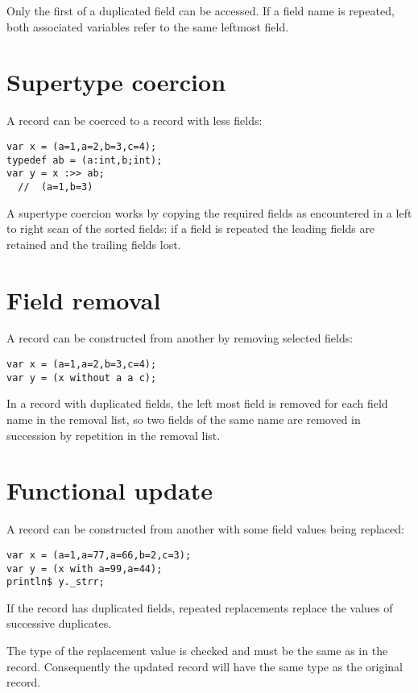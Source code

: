 \documentclass{article}
\begin{document}
Only the first of a duplicated field can be accessed.
If a field name is repeated, both associated variables
refer to the same leftmost field.

\section{Supertype coercion}
A record can be coerced to a record with less fields:

\begin{verbatim}
var x = (a=1,a=2,b=3,c=4);
typedef ab = (a:int,b;int);
var y = x :>> ab; 
  //  (a=1,b=3)
\end{verbatim}

A supertype coercion works by copying the required fields
as encountered in a left to right scan of the sorted fields:
if a field is repeated the leading fields are retained
and the trailing fields lost.

\section{Field removal}
A record can be constructed from another by removing
selected fields:

\begin{verbatim}
var x = (a=1,a=2,b=3,c=4);
var y = (x without a a c);
\end{verbatim}

In a record with duplicated fields, the left most field is removed
for each field name in the removal list, so two fields of the
same name are removed in succession by repetition in the removal
list.

\section{Functional update}
A record can be constructed from another with some field
values being replaced:

\begin{verbatim}
var x = (a=1,a=77,a=66,b=2,c=3);
var y = (x with a=99,a=44);
println$ y._strr;
\end{verbatim}

If the record has duplicated fields, repeated replacements
replace the values of successive duplicates.

The type of the replacement value is checked and must be
the same as in the record. Consequently the updated record
will have the same type as the original record.
\end{document}

